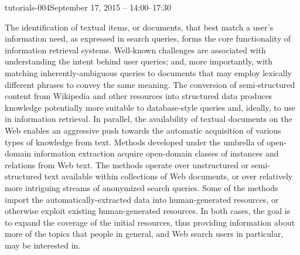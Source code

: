 \begin{tutorial}{tutorials-004}{September 17, 2015 -- 14:00--17:30}
{\TutLocD}

The identification of textual items, or documents, that best match
a user’s information need, as expressed in search queries, forms the
core functionality of information retrieval systems. Well-known challenges
are associated with understanding the intent behind user queries;
and, more importantly, with matching inherently-ambiguous queries
to documents that may employ lexically different phrases to convey
the same meaning. The conversion of semi-structured content from Wikipedia
and other resources into structured data produces knowledge potentially
more suitable to database-style queries and, ideally, to use in information
retrieval. In parallel, the availability of textual documents on the
Web enables an aggressive push towards the automatic acquisition of
various types of knowledge from text. Methods developed under the
umbrella of open-domain information extraction acquire open-domain
classes of instances and relations from Web text. The methods operate
over unstructured or semi-structured text available within collections
of Web documents, or over relatively more intriguing streams of anonymized
search queries. Some of the methods import the automatically-extracted
data into human-generated resources, or otherwise exploit existing
human-generated resources. In both cases, the goal is to expand the
coverage of the initial resources, thus providing information about
more of the topics that people in general, and Web search users in
particular, may be interested in.

\end{tutorial} 

\clearpage{}

